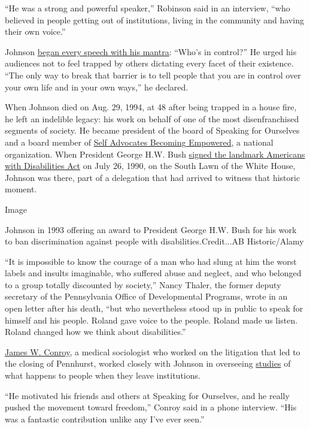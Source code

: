 ``He was a strong and powerful speaker,'' Robinson said in an interview,
``who believed in people getting out of institutions, living in the
community and having their own voice.''

Johnson \href{https://www.youtube.com/watch?v=zFI7u6V_GvA}{began every
speech with his mantra}: ``Who's in control?'' He urged his audiences
not to feel trapped by others dictating every facet of their existence.
``The only way to break that barrier is to tell people that you are in
control over your own life and in your own ways,'' he declared.

When Johnson died on Aug. 29, 1994, at 48 after being trapped in a house
fire, he left an indelible legacy: his work on behalf of one of the most
disenfranchised segments of society. He became president of the board of
Speaking for Ourselves and a board member of
\href{https://www.sabeusa.org/}{Self Advocates Becoming Empowered}, a
national organization. When President George H.W. Bush
\href{https://www.nytimes3xbfgragh.onion/interactive/2020/us/disability-ADA-30-anniversary.html}{signed
the landmark Americans with Disabilities Act} on July 26, 1990, on the
South Lawn of the White House, Johnson was there, part of a delegation
that had arrived to witness that historic moment.

Image

Johnson in 1993 offering an award to President George H.W. Bush for his
work to ban discrimination against people with disabilities.Credit...AB
Historic/Alamy

``It is impossible to know the courage of a man who had slung at him the
worst labels and insults imaginable, who suffered abuse and neglect, and
who belonged to a group totally discounted by society,'' Nancy Thaler,
the former deputy secretary of the Pennsylvania Office of Developmental
Programs, wrote in an open letter after his death, ``but who
nevertheless stood up in public to speak for himself and his people.
Roland gave voice to the people. Roland made us listen. Roland changed
how we think about disabilities.''

\href{http://www.eoutcome.org/default.aspx?pg=326}{James W. Conroy}, a
medical sociologist who worked on the litigation that led to the closing
of Pennhurst, worked closely with Johnson in overseeing
\href{https://aspe.hhs.gov/basic-report/pennhurst-longitudinal-study-combined-report-five-years-research-and-analysis}{studies}
of what happens to people when they leave institutions.

``He motivated his friends and others at Speaking for Ourselves, and he
really pushed the movement toward freedom,'' Conroy said in a phone
interview. ``His was a fantastic contribution unlike any I've ever
seen.''

